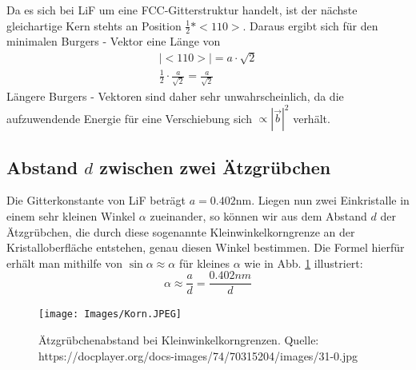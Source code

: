         Da es sich bei LiF um eine FCC-Gitterstruktur handelt, ist der nächste gleichartige Kern stehts an Position $\frac{1}{2} * <110>$. Daraus ergibt sich für den minimalen
        Burgers - Vektor eine Länge von
        \begin{align}
            |<110>| = a \cdot \sqrt{2} \\
            \frac{1}{2} \cdot \frac{a}{\sqrt{2}} = \frac{a}{\sqrt{2}}
        \end{align}
        Längere Burgers - Vektoren sind daher sehr unwahrscheinlich, da die aufzuwendende Energie für eine Verschiebung sich $\propto |\vec{b}|^2$ verhält.


    \subsection{Abstand $d$ zwischen zwei Ätzgrübchen}

	Die Gitterkonstante von LiF beträgt $a = 0.402$nm. Liegen nun zwei Einkristalle in einem sehr kleinen Winkel $\alpha$ zueinander, so können wir aus dem Abstand $d$ der 
	Ätzgrübchen, die durch diese sogenannte Kleinwinkelkorngrenze an der Kristalloberfläche entstehen, genau diesen Winkel bestimmen. Die Formel hierfür erhält man mithilfe
	von $\sin{\alpha} \approx \alpha$ für kleines $\alpha$ wie in Abb. \ref{FigKorn} illustriert:
	\begin{equation}
		\alpha \approx \frac{a}{d} = \frac{0.402nm}{d}
	\end{equation}

	\begin{figure}[H]
            \centering
            \texttt{[image: Images/Korn.JPEG]}
            \label{FigKorn}
            \caption{Ätzgrübchenabstand bei Kleinwinkelkorngrenzen. Quelle: https://docplayer.org/docs-images/74/70315204/images/31-0.jpg}
        \end{figure}

